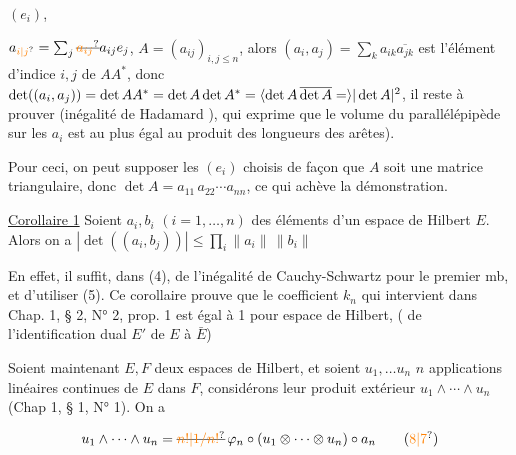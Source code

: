  $(e_i)$, 

  $a_{\unsure{i|j}}=\sum_j\deleted{\unsure{a_{ij}}}a_{ij}e_j$,
 $A=(a_{ij})_{i,j\leq n}$, alors $(a_i,a_j)=\sum_k a_{ik}\overline{a_{jk}}$
est l'élément d'indice $i,j$ de  $AA^*$, donc
$\det((a_i,a_j))=\det AA^*=\det A\det A^*=\inserted{\det A\,\overline{\det A}=}|\det A|^2$,  il
reste à prouver  (inégalité
de Hadamard \unsure{!}), qui exprime que le volume du
parallélépipède  sur les $a_i$ est au plus
égal au produit des longueurs des arêtes).


Pour ceci, on peut supposer les $(e_i)$ choisis de façon
que $A$ soit une matrice triangulaire, donc
$\det A=a_{11}\,a_{22}\cdots a_{nn}$, ce qui achève la démonstration.

\uline{Corollaire 1} Soient $a_i,b_i$ $(i=1,\ldots,n)$ des éléments d'un espace
de Hilbert $E$. Alors on a $|\det((a_i,b_j))|\leq\prod_i\|a_i\|\,\|b_i\|$

En effet, il suffit, dans (4), de  l'inégalité de
Cauchy-Schwartz pour le premier mb, et d'utiliser (5).
Ce corollaire prouve que le coefficient $k_n$ qui intervient
dans Chap. 1, § 2, N° 2, prop. 1 est égal à 1 pour   espace de
Hilbert, (  de l'identification  dual $E'$ de $E$ à $\bar E$)

Soient maintenant $E,F$ deux espaces de Hilbert, et
soient $u_1,\ldots u_n$ $n$ applications linéaires continues
de $E$ dans $F$, considérons leur produit extérieur
$u_1\wedge\cdots\wedge u_n$ (Chap 1, § 1, N° 1). On a

\[
u_1\wedge\cdots\wedge u_n=\deleted{\unsure{n!|1/n!}}\,\varphi_n\circ(u_1\otimes\cdots\otimes u_n)\circ a_n \tag*{(\unsure{8|7})}
\]

